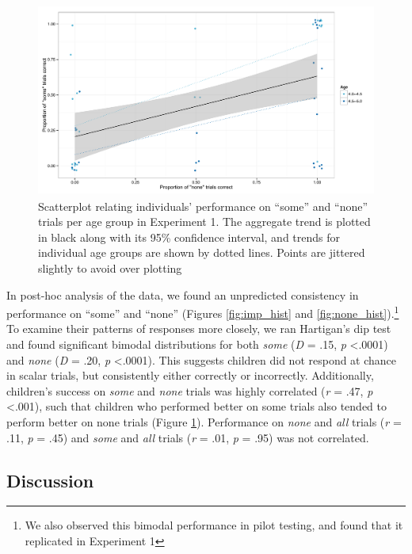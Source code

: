 \documentclass[man]{apa2}
\begin{document}
\begin{figure} 
 \begin{center} 
  \includegraphics[height=2.5in]{figures/exp1_diffs.pdf} 
  \caption{\label{fig:exp1_diffs} Scatterplot relating individuals' performance on ``some'' and ``none'' trials per age group in Experiment 1. The aggregate trend is plotted in black along with its 95\% confidence interval, and trends for individual age groups are shown by dotted lines. Points are jittered slightly to avoid over plotting} 
 \end{center} 
\end{figure}

In post-hoc analysis of the data, we found an unpredicted consistency in performance on ``some'' and ``none'' (Figures \ref{fig:imp_hist} and \ref{fig:none_hist}).\footnote{We also observed this bimodal performance in pilot testing, and found that it replicated in Experiment 1}  To examine their patterns of responses more closely, we ran Hartigan's dip test and found significant bimodal distributions for both \textit{some} (\textit{D} = .15, \textit{p} \textless  .0001) and \textit{none} (\textit{D} = .20, \textit{p} \textless  .0001). This suggests children did not respond at chance in scalar trials, but consistently either correctly or incorrectly. Additionally, children's success on \textit{some} and \textit{none} trials was highly correlated (\textit{r} = .47, \textit{p} \textless  .001), such that children who performed better on some trials also tended to perform better on none trials (Figure \ref{fig:exp1_diffs}).  Performance on \textit{none} and \textit{all} trials (\textit{r} = .11, \textit{p} = .45) and \textit{some} and \textit{all} trials (\textit{r} = .01, \textit{p} = .95) was not correlated. 

\subsection{Discussion}
\end{document}
